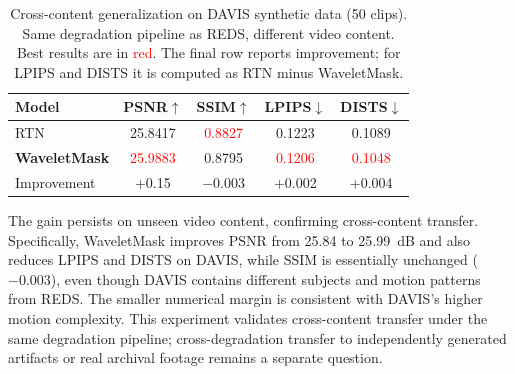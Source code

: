 \begin{table}[H]
\caption{Cross-content generalization on DAVIS synthetic data (50 clips). Same degradation pipeline as REDS, different video content. Best results are in \textcolor{red}{red}. The final row reports improvement; for LPIPS and DISTS it is computed as RTN minus WaveletMask.\label{tab:davis_cross_content}}
\begin{tabularx}{\textwidth}{lCCCC}
\toprule
\textbf{Model} & \textbf{PSNR$\uparrow$} & \textbf{SSIM$\uparrow$} & \textbf{LPIPS$\downarrow$} & \textbf{DISTS$\downarrow$} \\
\midrule
RTN & 25.8417 & \textcolor{red}{0.8827} & 0.1223 & 0.1089 \\
\textbf{WaveletMask} & \textcolor{red}{25.9883} & 0.8795 & \textcolor{red}{0.1206} & \textcolor{red}{0.1048} \\
\midrule
Improvement & +0.15 & $-$0.003 & +0.002 & +0.004 \\
\bottomrule
\end{tabularx}
\end{table}

The gain persists on unseen video content, confirming cross-content transfer. Specifically, WaveletMask improves PSNR from 25.84 to 25.99~dB and also reduces LPIPS and DISTS on DAVIS, while SSIM is essentially unchanged ($-0.003$), even though DAVIS contains different subjects and motion patterns from REDS. The smaller numerical margin is consistent with DAVIS's higher motion complexity. This experiment validates cross-content transfer under the same degradation pipeline; cross-degradation transfer to independently generated artifacts or real archival footage remains a separate question.
